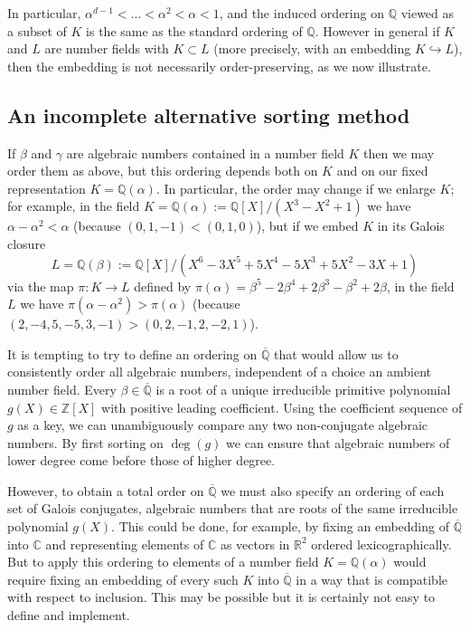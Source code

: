 \documentclass{article}
\def\Z{{\mathbb Z}}
\def\Q{{\mathbb Q}}
\def\R{{\mathbb R}}
\def\C{{\mathbb C}}
\def\Qbar{\overline{\Q}}
\begin{document}
In particular, $\alpha^{d-1}<\dots<\alpha^2<\alpha<1$, and the induced
ordering on $\Q$ viewed as a subset of $K$ is the same as the standard
ordering of $\Q$.  However in general if $K$ and $L$ are number fields
with $K\subset L$ (more precisely, with an embedding $K\hookrightarrow
L$), then the embedding is not necessarily order-preserving, as we now
illustrate.

\subsection{An incomplete alternative sorting method}

If $\beta$ and $\gamma$ are algebraic numbers contained in a number
field $K$ then we may order them as above, but this ordering depends
both on $K$ and on our fixed representation $K=\Q(\alpha)$.  In
particular, the order may change if we enlarge $K$; for example, in
the field $K=\Q(\alpha):=\Q[X]/(X^3-X^2+1)$ we have $\alpha-\alpha^2 <
\alpha$ (because $(0,1,-1) < (0,1,0)$), but if we embed $K$ in its
Galois closure $$L=\Q(\beta):=\Q[X]/(X^6 - 3X^5 + 5X^4 - 5X^3 + 5X^2 -
3X + 1)$$ via the map $\pi:K\to L$ defined by $\pi(\alpha) = \beta^5 -
2\beta^4 + 2\beta^3 - \beta^2 + 2\beta$, in the field $L$ we have
$\pi(\alpha-\alpha^2) > \pi(\alpha)$ (because
$(2,-4,5,-5,3,-1)>(0,2,-1,2,-2,1)$).

It is tempting to try to define an ordering on $\Qbar$ that would
allow us to consistently order all algebraic numbers, independent
of a choice an ambient number field.  Every $\beta\in\Qbar$ is a root of a
unique irreducible primitive polynomial $g(X)\in\Z[X]$  with positive
leading coefficient.  Using the coefficient sequence
of $g$ as a key, we can unambiguously  compare any two non-conjugate algebraic
numbers. By first sorting on $\deg(g)$ we can ensure that algebraic numbers of
lower degree come before those of higher degree.

However, to obtain a total order on $\Qbar$ we must also specify an
ordering of each set of Galois conjugates, algebraic numbers that are
roots of the same irreducible polynomial $g(X)$.  This could be done,
for example, by fixing an embedding of $\Qbar$ into $\C$ and
representing elements of $\C$ as vectors in $\R^2$ ordered
lexicographically. But to apply this ordering to elements of a number
field $K=\Q(\alpha)$ would require fixing an embedding of every such
$K$ into $\Qbar$ in a way that is compatible with respect to
inclusion.  This may be possible but it is certainly not easy to
define and implement.
\end{document}

